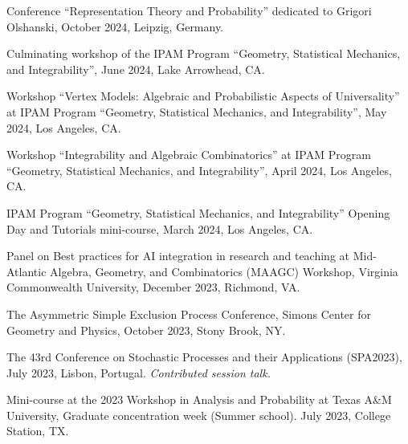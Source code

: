 \documentclass[letterpaper,11pt]{article}
\begin{document}
\begin{etaremune}
\item
Conference ``Representation Theory and Probability'' dedicated to Grigori Olshanski,
October 2024, Leipzig, Germany.

	\item
		Culminating workshop of the
		IPAM Program ``Geometry, Statistical Mechanics, and Integrability'',
		June 2024, Lake Arrowhead, CA.
	\item
		Workshop
		``Vertex Models: Algebraic and Probabilistic Aspects of Universality''
		at
		IPAM Program ``Geometry, Statistical Mechanics, and Integrability'',
		May 2024, Los Angeles, CA.
	\item
		Workshop ``Integrability and Algebraic Combinatorics''
		at
		IPAM Program ``Geometry, Statistical Mechanics, and Integrability'',
		April 2024, Los Angeles, CA.
	\item
	IPAM Program ``Geometry, Statistical Mechanics, and Integrability''
	Opening Day and Tutorials mini-course, March 2024, Los Angeles, CA.
	\item
	Panel on Best practices for AI integration in research and teaching
	at
	Mid-Atlantic Algebra, Geometry, and Combinatorics (MAAGC) Workshop,
	Virginia Commonwealth University,
	December 2023,
	Richmond, VA.

	\item
	The Asymmetric Simple Exclusion Process Conference, Simons Center for Geometry and Physics, October 2023, Stony Brook, NY.

	\item
	The 43rd Conference on Stochastic Processes and their Applications (SPA2023), July 2023, Lisbon, Portugal.
	\emph{Contributed session talk.}

	\item
	Mini-course at the
	2023 Workshop in Analysis and Probability at Texas A\&M University, Graduate concentration week (Summer school). July 2023, College Station, TX.


\end{etaremune}
\end{document}
